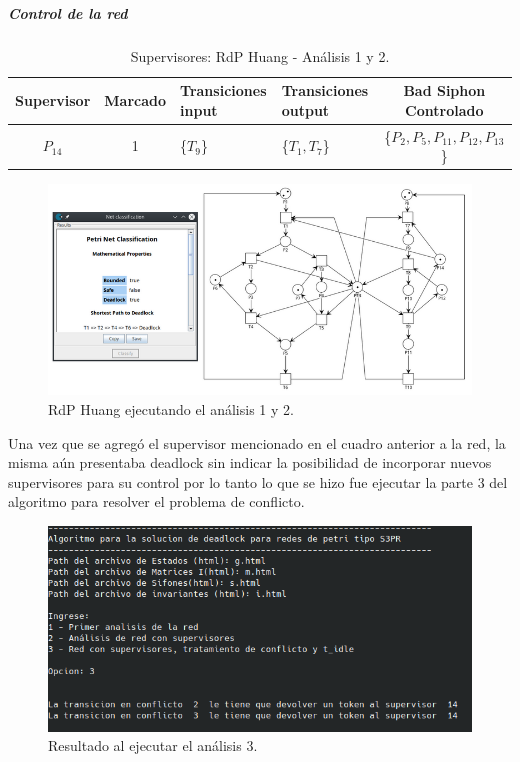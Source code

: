 \subparagraph{Control de la red}
\hfill

\begin{table}[H]
    \small
    \centering
    \begin{tabular}{|c|c|P{2.2cm}|P{2.2cm}|c|}
    \hline
    \textbf{Supervisor} & \textbf{Marcado} & \textbf{Transiciones input} & \textbf{Transiciones output} & \textbf{Bad Siphon Controlado}  \\  \hline
    $P_{14}$ & 1 & \{$T_{9}$\} & \{$T_{1}, T_{7}$\} & \{$P_2, P_{5}, P_{11}, P_{12}, P_{13}$\} \\ 
    \hline
    \end{tabular}
    \caption{Supervisores: RdP Huang - Análisis 1 y 2.}
    \label{tab:Huang12-v4}
\end{table}

\begin{figure}[H]
	\centering
	\includegraphics[width=\textwidth]{Figures/algoritmo4/huang_imag2.png}
	\caption{RdP Huang ejecutando el análisis 1 y 2.}
	\label{fig:Rdp-Huang3v4}
\end{figure}

Una vez que se agregó el supervisor mencionado en el cuadro anterior a la red, la misma aún presentaba deadlock sin indicar la posibilidad de incorporar nuevos supervisores para su control por lo tanto lo que se hizo fue ejecutar la parte 3 del algoritmo para resolver el problema de conflicto.
\bigskip

\begin{figure}[H]
	\centering
	\includegraphics[width=\textwidth]{Figures/algoritmo4/terminal-Huang-Ejec3.png}
	\caption{Resultado al ejecutar el análisis 3.}
	\label{fig:Rdp-Huang1y2v4}
\end{figure}
\bigskip

